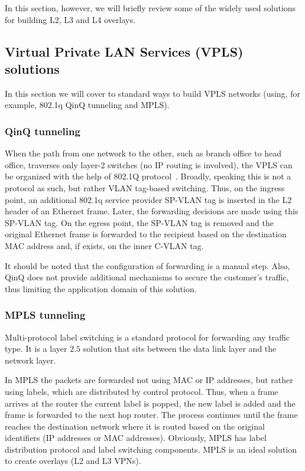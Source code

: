 In this section, however, we will briefly review some of the widely used solutions 
for building L2, L3 and L4 overlays.

\subsection{Virtual Private LAN Services (VPLS) solutions}

In this section we will cover 
to standard ways to build VPLS networks (using, for example, 802.1q QinQ tunneling and MPLS).

\subsubsection{QinQ tunneling}

When the path from one network to the other, such as branch office to head office,
traverses only layer-2 switches (\ie no IP routing is involved), the VPLS can be organized 
with the help of 802.1Q protocol~\cite{snr}. Broadly, speaking this is not a protocol as such, but rather 
VLAN tag-based switching. Thus, on the ingress point, an additional 802.1q service provider SP-VLAN tag 
is inserted in the L2 header of an Ethernet frame. Later, the forwarding decisions are 
made using this SP-VLAN tag. On the egress point, the SP-VLAN tag is removed and the original 
Ethernet frame is forwarded to the recipient based on the destination MAC address 
and, if exists, on the inner C-VLAN tag. 

It should be noted that the configuration of forwarding is a manual step.
Also, QinQ does not provide additional mechanisms to secure the customer's traffic,
thus limiting the application domain of this solution.

\subsubsection{MPLS tunneling}

Multi-protocol label switching is a standard protocol for forwarding any traffic type.
It is a layer $2.5$ solution that sits between the data link layer and the network layer.

In MPLS the packets are forwarded not using MAC or IP addresses, but 
rather using labels, which are distributed by control protocol. Thus, when a frame 
arrives at the router the current label is popped, the new label is added and the frame is
forwarded to the next hop router. The process continues until the frame reaches the 
destination network where it is routed based on the original identifiers (IP addresses or MAC addresses).
Obviously, MPLS has label distribution protocol and label switching components.
MPLS is an ideal solution to create overlays (\ie L2 and L3 VPNs).

